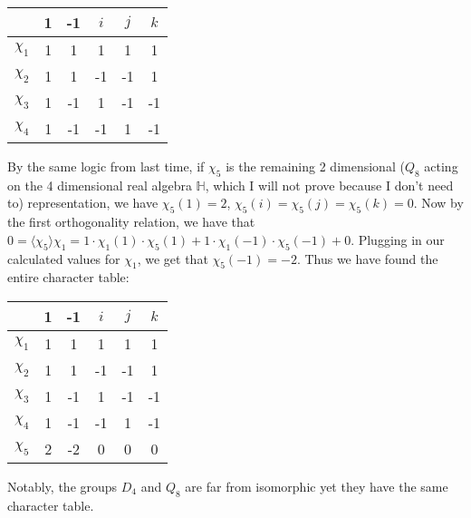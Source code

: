 \documentclass[12pt]{article}
\theoremstyle{definitionstyle}
\def\mbb#1{\mathbb{#1}}
\renewcommand{\ip}[1]{\langle #1 \rangle}
\begin{document}
\begin{enumerate}
        \begin{center}
            \begin{tabular}{c|ccccc}
                & 1 & -1 & $i$ & $j$ & $k$ \\
                \hline
                $\chi_1$ & 1 & 1 & 1 & 1 & 1 \\
                $\chi_2$ & 1 & 1 & -1 & -1 & 1 \\
                $\chi_3$ & 1 & -1 & 1 & -1 & -1 \\
                $\chi_4$ & 1 & -1 & -1 & 1 & -1
            \end{tabular}
        \end{center}
        By the same logic from last time, if $\chi_5$ is the remaining 2 dimensional ($Q_8$ acting on the 4 dimensional real algebra $\mbb{H}$, which I will not prove because I don't need to) representation, we have $\chi_5(1) = 2$, $\chi_5(i) = \chi_5(j) = \chi_5(k) = 0$. Now by the first orthogonality relation, we have that
        $0 = \ip{\chi_5}{\chi_1} = 1 \cdot \chi_1(1) \cdot \chi_5(1) + 1 \cdot \chi_1(-1) \cdot \chi_5(-1) + 0$. Plugging in our calculated values for $\chi_1$, we get that $\chi_5(-1) = -2$. Thus we have found the entire character table:
        \begin{center}
            \begin{tabular}{c|ccccc}
                & 1 & -1 & $i$ & $j$ & $k$ \\
                \hline
                $\chi_1$ & 1 & 1 & 1 & 1 & 1 \\
                $\chi_2$ & 1 & 1 & -1 & -1 & 1 \\
                $\chi_3$ & 1 & -1 & 1 & -1 & -1 \\
                $\chi_4$ & 1 & -1 & -1 & 1 & -1 \\
                $\chi_5$ & 2 & -2 & 0 & 0 & 0
            \end{tabular}
        \end{center}
        Notably, the groups $D_4$ and $Q_8$ are far from isomorphic yet they have the same character table.


\end{enumerate}
\end{document}

